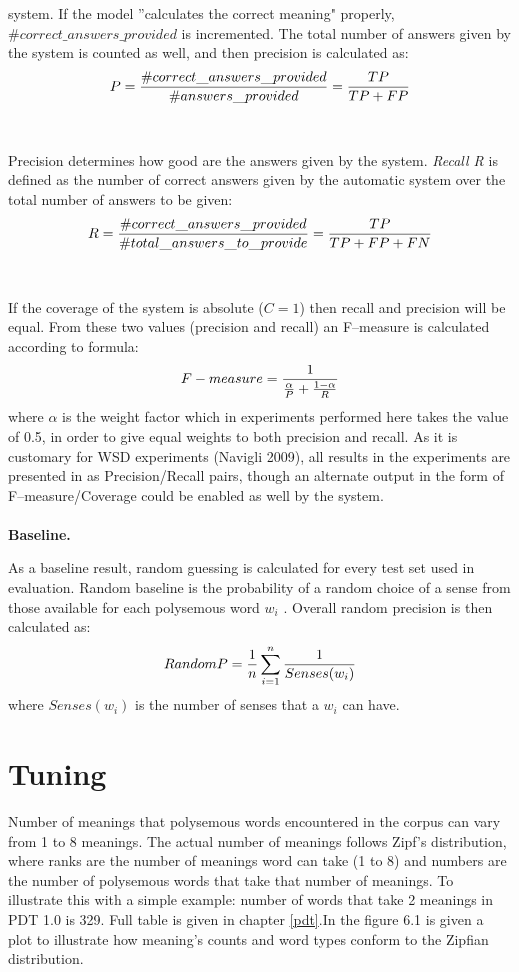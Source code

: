 system. If the model ''calculates the correct meaning" properly, 
\\$\#correct\_answers\_provided$ is 
incremented. The total number of answers given by the system is counted as well, and then precision 
is calculated as: 
\begin{equation}
\large{P=\frac{\#correct\_answers\_provided}{\#answers\_provided}=\frac{TP}{TP+FP}
}
\end{equation}
\\\\
Precision determines how good are the answers given by the system.
\textit{Recall R} is defined as the number of correct answers given by the automatic system
over the total number of answers to be given:
\begin{equation}
\large{
R=\frac{\#correct\_answers\_provided}{\#total\_answers\_to\_provide}=\frac{TP}{TP+FP+FN}
}
\end{equation}
\\\\
If the coverage of the system is absolute ($C=1$) then recall and precision will be equal. 
From these two values (precision and recall) an F--measure is calculated according to formula:
\begin{equation}
\large{
F-measure=\large{\frac{1}{\frac{\alpha}{P}+\frac{1-\alpha}{R}}}
}
\end{equation}
where $\alpha$ is the weight factor which in experiments performed here takes the value of 0.5, in order to give equal weights 
to both precision and recall. As it is customary for WSD experiments (Navigli 2009), all results in the experiments are presented in 
as Precision/Recall pairs, though an alternate output in the form of F--measure/Coverage could be enabled as well by the 
system.   
\\\\
\textbf{Baseline.}

As a baseline result, random guessing is calculated for every test set used in evaluation. Random baseline is the probability of a 
random choice of a sense from those available for each polysemous word $w_i$ . Overall random 
precision is then calculated as:
\begin{equation}
\large{
RandomP=\frac{1}{n} \sum_{i=1}^{n}\frac{1}{Senses(w_i)}
}
\end{equation}
where $Senses(w_i)$ is the number of senses that a $w_i$ can have. 

\section{Tuning}
Number of meanings that polysemous words encountered in the corpus can vary from 1 to 8 meanings. The actual number of meanings follows Zipf's distribution, where ranks are the number of meanings word 
can take (1 to 8) and numbers are the number of polysemous words that take that number of meanings. 
To illustrate this with a simple example: number of words that take 2 meanings in PDT 1.0 is 329. 
Full table is given in chapter \ref{pdt}.In the figure 6.1 is given a plot to illustrate how meaning's counts and word 
types conform to the Zipfian distribution.

